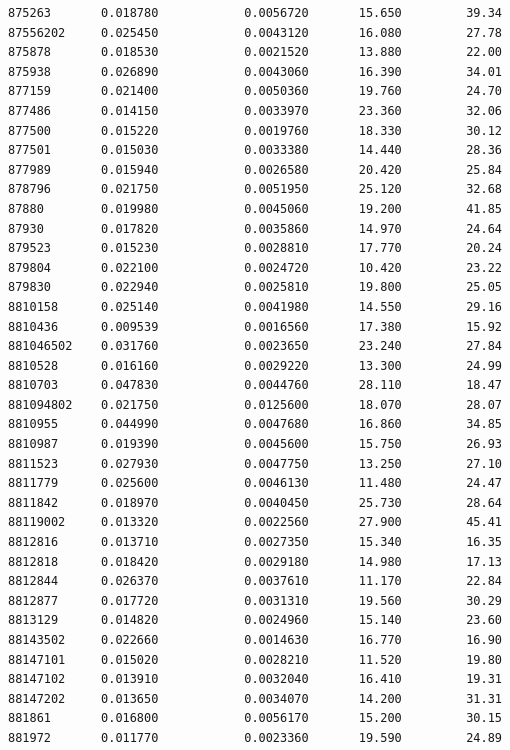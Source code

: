 \documentclass[
  letterpaper,
  DIV=11,
  numbers=noendperiod]{scrartcl}
\begin{document}
\begin{verbatim}
875263       0.018780            0.0056720       15.650         39.34
87556202     0.025450            0.0043120       16.080         27.78
875878       0.018530            0.0021520       13.880         22.00
875938       0.026890            0.0043060       16.390         34.01
877159       0.021400            0.0050360       19.760         24.70
877486       0.014150            0.0033970       23.360         32.06
877500       0.015220            0.0019760       18.330         30.12
877501       0.015030            0.0033380       14.440         28.36
877989       0.015940            0.0026580       20.420         25.84
878796       0.021750            0.0051950       25.120         32.68
87880        0.019980            0.0045060       19.200         41.85
87930        0.017820            0.0035860       14.970         24.64
879523       0.015230            0.0028810       17.770         20.24
879804       0.022100            0.0024720       10.420         23.22
879830       0.022940            0.0025810       19.800         25.05
8810158      0.025140            0.0041980       14.550         29.16
8810436      0.009539            0.0016560       17.380         15.92
881046502    0.031760            0.0023650       23.240         27.84
8810528      0.016160            0.0029220       13.300         24.99
8810703      0.047830            0.0044760       28.110         18.47
881094802    0.021750            0.0125600       18.070         28.07
8810955      0.044990            0.0047680       16.860         34.85
8810987      0.019390            0.0045600       15.750         26.93
8811523      0.027930            0.0047750       13.250         27.10
8811779      0.025600            0.0046130       11.480         24.47
8811842      0.018970            0.0040450       25.730         28.64
88119002     0.013320            0.0022560       27.900         45.41
8812816      0.013710            0.0027350       15.340         16.35
8812818      0.018420            0.0029180       14.980         17.13
8812844      0.026370            0.0037610       11.170         22.84
8812877      0.017720            0.0031310       19.560         30.29
8813129      0.014820            0.0024960       15.140         23.60
88143502     0.022660            0.0014630       16.770         16.90
88147101     0.015020            0.0028210       11.520         19.80
88147102     0.013910            0.0032040       16.410         19.31
88147202     0.013650            0.0034070       14.200         31.31
881861       0.016800            0.0056170       15.200         30.15
881972       0.011770            0.0023360       19.590         24.89

\end{verbatim}
\end{document}
